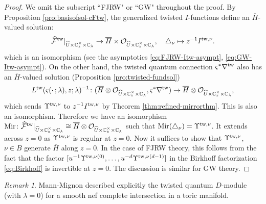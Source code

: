 \documentclass[11pt]{amsart}
\theoremstyle{definition} %
\theoremstyle{remark} %
\newtheorem{rem}[thm]{Remark}%
\newcommand{\CC}{\mathbb C}
\newcommand{\tw}{{\rm tw}}
\newcommand{\cO}{\mathcal{O}}
\newcommand{\cF}{\mathcal{F}}
\newcommand{\hcF}{\widehat{\cF}}
\newcommand{\cR}{\mathcal{R}}
\newcommand{\hcR}{\widehat{\cR}}
\newcommand{\Mir}{\operatorname{Mir}}
\newcommand{\hU}{\widehat{U}}
\newcommand{\ov}{\overline}
\begin{document}
\begin{proof} 
We omit the subscript ``FJRW" or ``GW" throughout the proof. 
By Proposition \ref{pro:basisofsol-cFtw}, 
the generalized twisted $I$-functions 
define an $\ov{H}$-valued solution: 
\begin{equation} 
\label{eq:I-solution} 
\hcF^\tw|_{\hU\times \CC_z^\times \times \CC_\lambda}
\to \ov{H}\times \cO_{\hU\times \CC_z^\times \times \CC_\lambda}, \quad 
\triangle_\nu \mapsto z^{-1} I^{\tw,\nu}.  
\end{equation} 
which is an isomorphism (see the asymptotics 
\eqref{eq:FJRW-Itw-asympt}, \eqref{eq:GW-Itw-asympt}). 
On the other hand, the twisted quantum connection 
$\varsigma^* \nabla^\tw$ 
also has an $\ov{H}$-valued solution 
(Proposition \ref{pro:twisted-fundsol})
\[
L^\tw(\varsigma(\cdot\,;\lambda), z;\lambda)^{-1} \colon 
(\ov{H}\otimes \cO_{\hU\times \CC_z^\times \times \CC_\lambda},
\varsigma^*\nabla^\tw) \to 
\ov{H}\otimes \cO_{\hU\times \CC_z^\times \times \CC_\lambda}, 
\]
which sends $\Upsilon^{\tw, \nu}$ to $z^{-1} I^{\tw,\nu}$ 
by Theorem \ref{thm:refined-mirrorthm}. This is also an isomorphism. 
Therefore we have an isomorphism $\Mir \colon 
\hcF^\tw|_{\hU\times \CC_z^\times \times \CC_\lambda}\cong 
\ov{H}\otimes \cO_{\hU\times \CC_z^\times \times \CC_\lambda}$ 
such that $\Mir(\triangle_\nu) = \Upsilon^{\tw,\nu}$.  
It extends across $z=0$ as $\Upsilon^{\tw,\nu}$ is regular 
at $z=0$. 
Now it suffices to show that 
$\Upsilon^{\tw, \nu}$, $\nu\in B$ 
generate $\ov{H}$ along $z=0$. 
In the case of FJRW theory, this follows 
from the fact that the factor 
$[u^{-1}\Upsilon^{\tw,\nu(0)},\dots,u^{-d}\Upsilon^{\tw,\nu(d-1)}]$ 
in the Birkhoff factorization \eqref{eq:Birkhoff} 
is invertible at $z=0$.   
The discussion is similar for GW theory. 
\end{proof} 
\begin{rem} 
Mann-Mignon \cite[Theorem 1.2]{Mann-Mignon} described explicitly the 
twisted quantum $D$-module (with $\lambda=0$) for a 
smooth nef complete intersection in a toric manifold. 
\end{rem} 
\end{document}
